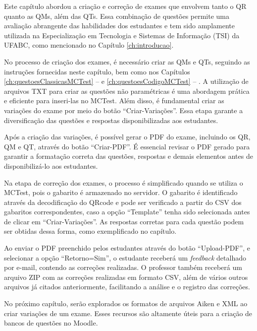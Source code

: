 Este capítulo abordou a criação e correção de exames que envolvem tanto o QR quanto as QMs, além das QTs. Essa combinação de questões permite uma avaliação abrangente das habilidades dos estudantes e tem sido amplamente utilizada na Especialização em Tecnologia e Sistemas de Informação (TSI) da UFABC, como mencionado no Capítulo \ref{ch:introducao}.

No processo de criação dos exames, é necessário criar as QMs e QTs, seguindo as instruções fornecidas neste capítulo, bem como nos Capítulos \ref{ch:questoesClassicasMCTest} --  e \ref{ch:questoesCodigoMCTest} -- . A utilização de arquivos TXT para criar as questões não paramétricas é uma abordagem prática e eficiente para inseri-las no MCTest. Além disso, é fundamental criar as variações do exame por meio do botão ``Criar-Variações''. Essa etapa garante a diversificação das questões e respostas disponibilizadas aos estudantes.

Após a criação das variações, é possível gerar o PDF do exame, incluindo os QR, QM e QT, através do botão ``Criar-PDF''. É essencial revisar o PDF gerado para garantir a formatação correta das questões, respostas e demais elementos antes de disponibilizá-lo aos estudantes.

Na etapa de correção dos exames, o processo é simplificado quando se utiliza o MCTest, pois o gabarito é armazenado no servidor. O gabarito é identificado através da decodificação do QRcode e pode ser verificado a partir do CSV dos gabaritos correspondentes, caso a opção ``Template'' tenha sido selecionada antes de clicar em ``Criar-Variações''. As respostas corretas para cada questão podem ser obtidas dessa forma, como exemplificado no capítulo.

Ao enviar o PDF preenchido pelos estudantes através do botão ``Upload-PDF'', e selecionar a opção ``Retorno=Sim'', o estudante receberá um \textit{feedback} detalhado por e-mail, contendo as correções realizadas. O professor também receberá um arquivo ZIP com as correções realizadas em formato CSV, além de vários outros arquivos já citados anteriormente, facilitando a análise e o registro das correções.

No próximo capítulo, serão explorados os formatos de arquivos Aiken e XML ao criar variações de um exame. Esses recursos são altamente úteis para a criação de bancos de questões no Moodle.

